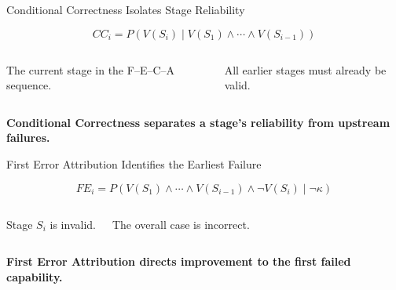 \begin{frame}{Conditional Correctness Isolates Stage Reliability}
  \vspace{0.14cm}
  \centering
  \par\vspace{0.20cm}
  \begin{equation}
    CC_i=P\!\left(V(S_i)\mid V(S_1)\land\cdots\land V(S_{i-1})\right)
    \label{eq:conditional-correctness}
  \end{equation}
  \vspace{0.22cm}
  \begin{columns}[T,onlytextwidth]
      \par
      The current stage in the F--E--C--A sequence.
      \par
      All earlier stages must already be valid.
  \end{columns}
  \vfill
  \centering
  {\large\bfseries\color{DeepBlue}Conditional Correctness separates a stage's reliability from upstream failures.}
\end{frame}

\begin{frame}{First Error Attribution Identifies the Earliest Failure}
  \vspace{0.10cm}
  \centering
  \par\vspace{0.18cm}
  \begin{equation}
    FE_i=P\!\left(V(S_1)\land\cdots\land V(S_{i-1})\land\neg V(S_i)\mid\neg\kappa\right)
    \label{eq:first-error-attribution}
  \end{equation}
  \vspace{0.18cm}
  \begin{columns}[T,onlytextwidth]
      \par
      Stage $S_i$ is invalid.
      \sectionlabel{$\neg\kappa$}\par
      The overall case is incorrect.
  \end{columns}
  \vfill
  \centering
  {\large\bfseries\color{DeepBlue}First Error Attribution directs improvement to the first failed capability.}
\end{frame}


